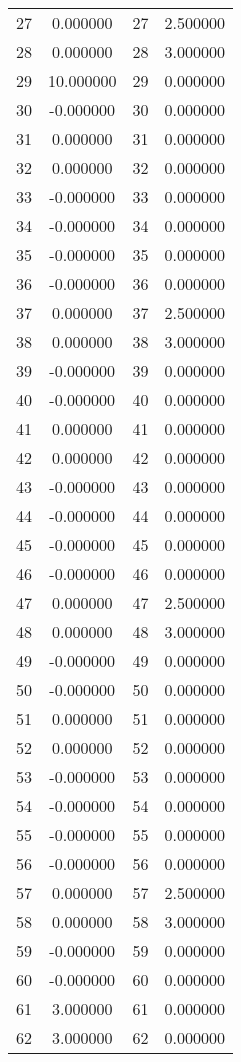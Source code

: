 \documentclass[12pt]{article}
\begin{document}
\begin{longtable}{@{}cccc@{}}
27 & 0.000000 & 27 & 2.500000 \\
28 & 0.000000 & 28 & 3.000000 \\
29 & 10.000000 & 29 & 0.000000 \\
30 & -0.000000 & 30 & 0.000000 \\
31 & 0.000000 & 31 & 0.000000 \\
32 & 0.000000 & 32 & 0.000000 \\
33 & -0.000000 & 33 & 0.000000 \\
34 & -0.000000 & 34 & 0.000000 \\
35 & -0.000000 & 35 & 0.000000 \\
36 & -0.000000 & 36 & 0.000000 \\
37 & 0.000000 & 37 & 2.500000 \\
38 & 0.000000 & 38 & 3.000000 \\
39 & -0.000000 & 39 & 0.000000 \\
40 & -0.000000 & 40 & 0.000000 \\
41 & 0.000000 & 41 & 0.000000 \\
42 & 0.000000 & 42 & 0.000000 \\
43 & -0.000000 & 43 & 0.000000 \\
44 & -0.000000 & 44 & 0.000000 \\
45 & -0.000000 & 45 & 0.000000 \\
46 & -0.000000 & 46 & 0.000000 \\
47 & 0.000000 & 47 & 2.500000 \\
48 & 0.000000 & 48 & 3.000000 \\
49 & -0.000000 & 49 & 0.000000 \\
50 & -0.000000 & 50 & 0.000000 \\
51 & 0.000000 & 51 & 0.000000 \\
52 & 0.000000 & 52 & 0.000000 \\
53 & -0.000000 & 53 & 0.000000 \\
54 & -0.000000 & 54 & 0.000000 \\
55 & -0.000000 & 55 & 0.000000 \\
56 & -0.000000 & 56 & 0.000000 \\
57 & 0.000000 & 57 & 2.500000 \\
58 & 0.000000 & 58 & 3.000000 \\
59 & -0.000000 & 59 & 0.000000 \\
60 & -0.000000 & 60 & 0.000000 \\
61 & 3.000000 & 61 & 0.000000 \\
62 & 3.000000 & 62 & 0.000000 \\

\end{longtable}
\end{document}
